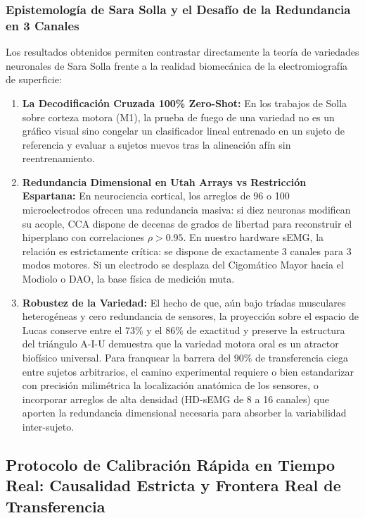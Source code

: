 \documentclass[11pt,a4paper,openany]{book}
\theoremstyle{definition}
\begin{document}
\subsubsection{Epistemología de Sara Solla y el Desafío de la Redundancia en 3 Canales}
\label{subsubsec:epistemologia_sara_solla}

Los resultados obtenidos permiten contrastar directamente la teoría de variedades neuronales de Sara Solla frente a la realidad biomecánica de la electromiografía de superficie:
\begin{enumerate}
    \item \textbf{La Decodificación Cruzada 100\% Zero-Shot:} En los trabajos de Solla sobre corteza motora (M1), la prueba de fuego de una variedad no es un gráfico visual sino congelar un clasificador lineal entrenado en un sujeto de referencia y evaluar a sujetos nuevos tras la alineación afín sin reentrenamiento.
    \item \textbf{Redundancia Dimensional en Utah Arrays vs Restricción Espartana:} En neurociencia cortical, los arreglos de 96 o 100 microelectrodos ofrecen una redundancia masiva: si diez neuronas modifican su acople, CCA dispone de decenas de grados de libertad para reconstruir el hiperplano con correlaciones $\rho > 0.95$. En nuestro hardware sEMG, la relación es estrictamente crítica: se dispone de exactamente $3$ canales para $3$ modos motores. Si un electrodo se desplaza del Cigomático Mayor hacia el Modiolo o DAO, la base física de medición muta.
    \item \textbf{Robustez de la Variedad:} El hecho de que, aún bajo tríadas musculares heterogéneas y cero redundancia de sensores, la proyección sobre el espacio de Lucas conserve entre el $73\%$ y el $86\%$ de exactitud y preserve la estructura del triángulo A-I-U demuestra que la variedad motora oral es un atractor biofísico universal. Para franquear la barrera del $90\%$ de transferencia ciega entre sujetos arbitrarios, el camino experimental requiere o bien estandarizar con precisión milimétrica la localización anatómica de los sensores, o incorporar arreglos de alta densidad (HD-sEMG de 8 a 16 canales) que aporten la redundancia dimensional necesaria para absorber la variabilidad inter-sujeto.
\end{enumerate}

\subsection{Protocolo de Calibración Rápida en Tiempo Real: Causalidad Estricta y Frontera Real de Transferencia}
\label{subsec:calibracion_rapida_tiempo_real}
\end{document}
